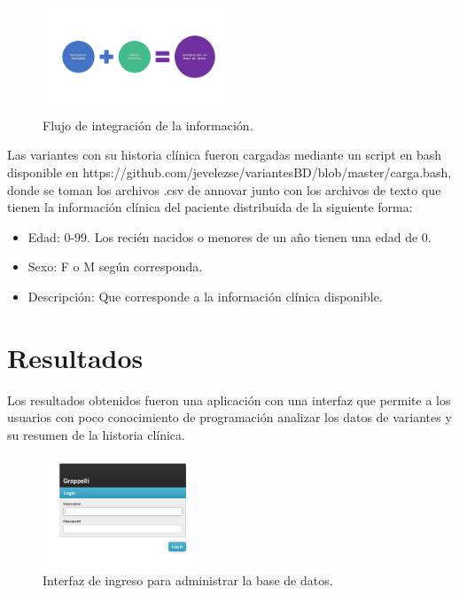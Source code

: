 \begin{figure}[H] 
	\centering
	\includegraphics[width=0.5\textwidth]{Kap3/flujo2}
	\caption{Flujo de integración de la información.} 
	\label{fig:flujo2}
\end{figure}

Las variantes con su historia clínica fueron cargadas mediante un script en bash disponible en https://github.com/jevelezse/variantesBD/blob/master/carga.bash, donde se toman los archivos .csv de annovar junto con los archivos de texto que tienen la información clínica del paciente distribuida de la siguiente forma:

\begin{itemize}
	\item Edad: 0-99. Los recién nacidos  o menores de un año tienen una edad de 0.
	\item Sexo: F o M según corresponda.
	\item Descripción: Que corresponde a la información clínica disponible.
\end{itemize} 

\section{Resultados} 

Los resultados obtenidos fueron una aplicación con una interfaz que permite a los usuarios con poco conocimiento de  programación  analizar los datos de variantes y su resumen de la historia clínica. \\

\begin{figure}[h] 
	\centering
	\includegraphics[width=0.4\textwidth]{Kap3/admin_django}
	\caption{Interfaz de ingreso para  administrar la base de datos.} \label{fig:admin}
\end{figure}

